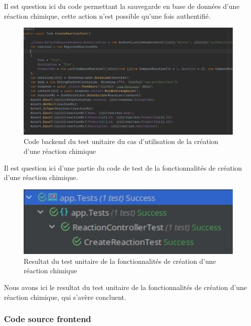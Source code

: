 Il est question ici du code permettant la sauvegarde en base de données d'une réaction chimique, cette action n'est possible qu'une fois authentifié.

\begin{figure}[H]
	\centering
	\includegraphics[width=1\textwidth]{img/creac}
	\caption{Code backend du test unitaire du cas d'utilisation de la création d'une réaction chimique}
\end{figure}

Il est question ici d'une partie du code de test de la fonctionnalités de création d'une réaction chimique.

\begin{figure}[H]
	\centering
	\includegraphics[width=1\textwidth]{img/utcre}
	\caption{Resultat du test unitaire de la fonctionnalités de création d'une réaction chimique}
\end{figure}

Nous avons ici le resultat du test unitaire de la fonctionnalités de création d'une réaction chimique, qui s'avère concluent.

\subsubsection{Code source frontend}

